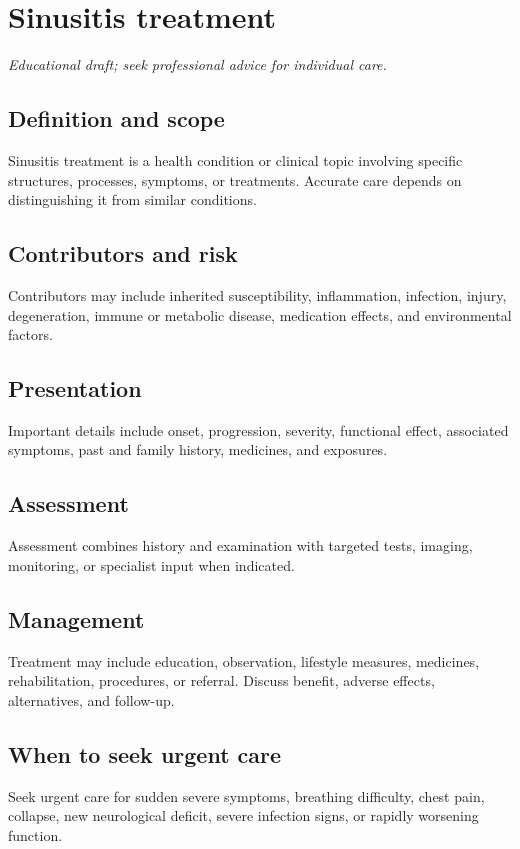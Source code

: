 \chapter{Sinusitis treatment}
\medskip
\noindent\textit{Educational draft; seek professional advice for individual care.}

\section*{Definition and scope}
Sinusitis treatment is a health condition or clinical topic involving specific structures, processes, symptoms, or treatments. Accurate care depends on distinguishing it from similar conditions.

\section*{Contributors and risk}
Contributors may include inherited susceptibility, inflammation, infection, injury, degeneration, immune or metabolic disease, medication effects, and environmental factors.

\section*{Presentation}
Important details include onset, progression, severity, functional effect, associated symptoms, past and family history, medicines, and exposures.

\section*{Assessment}
Assessment combines history and examination with targeted tests, imaging, monitoring, or specialist input when indicated.

\section*{Management}
Treatment may include education, observation, lifestyle measures, medicines, rehabilitation, procedures, or referral. Discuss benefit, adverse effects, alternatives, and follow-up.

\section*{When to seek urgent care}
Seek urgent care for sudden severe symptoms, breathing difficulty, chest pain, collapse, new neurological deficit, severe infection signs, or rapidly worsening function.

